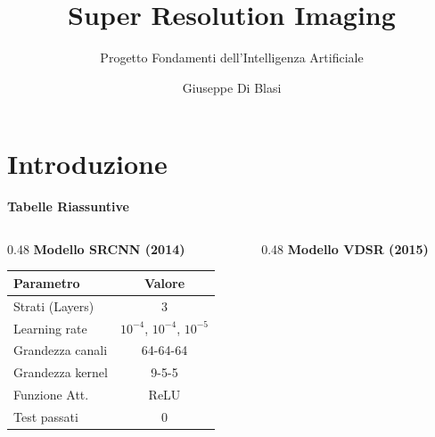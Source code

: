\documentclass[aspectratio=169]{beamer}
\title{Super Resolution Imaging}
\subtitle{Progetto Fondamenti dell'Intelligenza Artificiale}
\author{Giuseppe Di Blasi}
\institute{Università di Parma}
\date{}
\begin{document}
\begin{frame}
\titlepage
\end{frame}


\section{Introduzione}





\begin{frame}{\textbf{Tabelle Riassuntive}}

    \begin{columns}[t] %

        \begin{column}{0.48\textwidth}
            \centering
            \textbf{Modello SRCNN (2014)}
            \vspace{0.2cm}

            \begin{tabular}{|l|c|}
                \hline
                \textbf{Parametro} & \textbf{Valore} \\ \hline
                Strati (Layers)    & 3               \\ \hline
                Learning rate      & $10^{-4}$, $10^{-4}$, $10^{-5}$ \\ \hline
                Grandezza canali   & 64-64-64        \\ \hline
                Grandezza kernel   & 9-5-5           \\ \hline
                Funzione Att.      & ReLU            \\ \hline
                Test passati       & 0               \\ \hline

            \end{tabular}
        \end{column}

        \begin{column}{0.48\textwidth}
            \centering
            \textbf{Modello VDSR (2015)}
            \vspace{0.2cm}


\end{column}
\end{columns}
\end{frame}
\end{document}
